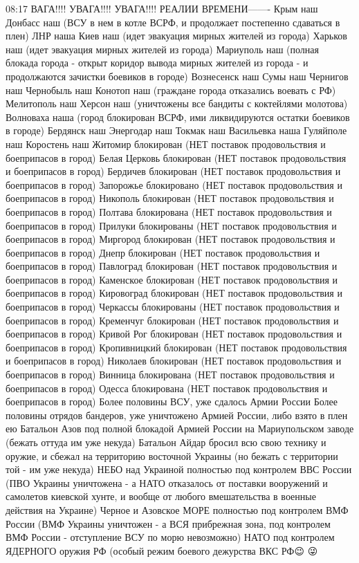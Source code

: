 08:17
ВАГА!!!! УВАГА!!!! УВАГА!!!! РЕАЛИИ ВРЕМЕНИ------- Крым наш
Донбасс наш (ВСУ в нем в котле ВСРФ, и продолжает постепенно сдаваться в плен)
ЛНР наша
Киев наш (идет эвакуация мирных жителей из города)
Харьков наш (идет эвакуация мирных жителей из города)
Мариуполь наш (полная блокада города - открыт коридор вывода мирных жителей из города - и продолжаются зачистки боевиков в городе)
Вознесенск наш
Сумы наш
Чернигов наш
Чернобыль наш
Конотоп наш (граждане города отказались воевать с РФ)
Мелитополь наш
Херсон наш (уничтожены все бандиты с коктейлями молотова)
Волноваха наша (город блокирован ВСРФ, ими ликвидируются остатки боевиков в городе)
Бердянск наш
Энергодар наш
Токмак наш
Васильевка наша
Гуляйполе наш
Коростень наш
Житомир блокирован (НЕТ поставок продовольствия и боеприпасов в город)
Белая Церковь блокирован (НЕТ поставок продовольствия и боеприпасов в город)
Бердичев блокирован (НЕТ поставок продовольствия и боеприпасов в город)
Запорожье блокировано (НЕТ поставок продовольствия и боеприпасов в город)
Никополь блокирован (НЕТ поставок продовольствия и боеприпасов в город)
Полтава блокирована (НЕТ поставок продовольствия и боеприпасов в город)
Прилуки блокированы (НЕТ поставок продовольствия и боеприпасов в город)
Миргород блокирован (НЕТ поставок продовольствия и боеприпасов в город)
Днепр блокирован (НЕТ поставок продовольствия и боеприпасов в город)
Павлоград блокирован (НЕТ поставок продовольствия и боеприпасов в город)
Каменское блокирован (НЕТ поставок продовольствия и боеприпасов в город)
Кировоград блокирован (НЕТ поставок продовольствия и боеприпасов в город)
Черкассы блокированы (НЕТ поставок продовольствия и боеприпасов в город)
Кременчуг блокирован (НЕТ поставок продовольствия и боеприпасов в город)
Кривой Рог блокирован (НЕТ поставок продовольствия и боеприпасов в город)
Кропивницкий блокирован (НЕТ поставок продовольствия и боеприпасов в город)
Николаев блокирован (НЕТ поставок продовольствия и боеприпасов в город)
Винница блокирована (НЕТ поставок продовольствия и боеприпасов в город)
Одесса блокирована (НЕТ поставок продовольствия и боеприпасов в город)
Более половины ВСУ, уже сдалось Армии России
Более половины отрядов бандеров, уже уничтожено Армией России, либо взято в плен ею
Батальон Азов под полной блокадой Армией России на Мариупольском заводе (бежать оттуда им уже некуда)
Батальон Айдар бросил всю свою технику и оружие, и сбежал на территорию восточной Украины (но бежать с территории той - им уже некуда)
НЕБО над Украиной полностью под контролем ВВС России (ПВО Украины уничтожена - а НАТО отказалось от поставки вооружений и самолетов киевской хунте, и вообще от любого вмешательства в военные действия на Украине)
Черное и Азовское МОРЕ полностью под контролем ВМФ России (ВМФ Украины уничтожен - а ВСЯ прибрежная зона, под контролем ВМФ России - отступление ВСУ по морю невозможно)
НАТО под контролем ЯДЕРНОГО оружия РФ (особый режим боевого дежурства ВКС РФ😉 😜


